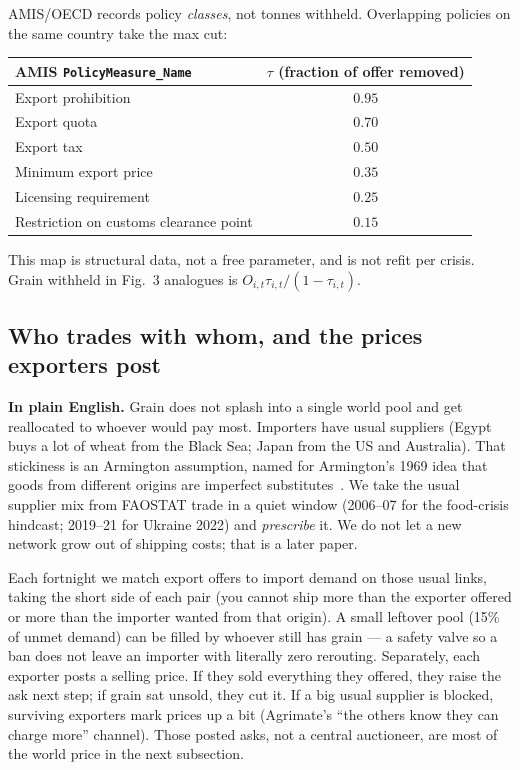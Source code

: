 AMIS/OECD records policy \emph{classes}, not tonnes withheld. Overlapping
policies on the same country take the max cut:
\begin{center}
\small
\begin{tabular}{lc}
\toprule
AMIS \texttt{PolicyMeasure\_Name} & $\tau$ (fraction of offer removed) \\
\midrule
Export prohibition & $0.95$ \\
Export quota & $0.70$ \\
Export tax & $0.50$ \\
Minimum export price & $0.35$ \\
Licensing requirement & $0.25$ \\
Restriction on customs clearance point & $0.15$ \\
\bottomrule
\end{tabular}
\end{center}
This map is structural data, not a free parameter, and is not refit per
crisis. Grain withheld in Fig.~3 analogues is
$O_{i,t}\tau_{i,t}/(1-\tau_{i,t})$.

\subsection{Who trades with whom, and the prices exporters post}
\label{sec:armington}

\textbf{In plain English.} Grain does not splash into a single world pool
and get reallocated to whoever would pay most. Importers have usual
suppliers (Egypt buys a lot of wheat from the Black Sea; Japan from the US
and Australia). That stickiness is an Armington assumption, named for
Armington's 1969 idea that goods from different origins are imperfect
substitutes~\citep{armington1969}. We take the usual supplier mix from
FAOSTAT trade in a quiet window (2006--07 for the food-crisis hindcast;
2019--21 for Ukraine 2022) and \emph{prescribe} it. We do not let a new
network grow out of shipping costs; that is a later paper.

Each fortnight we match export offers to import demand on those usual links,
taking the short side of each pair (you cannot ship more than the exporter
offered or more than the importer wanted from that origin). A small leftover
pool (15\% of unmet demand) can be filled by whoever still has grain --- a
safety valve so a ban does not leave an importer with literally zero
rerouting. Separately, each exporter posts a selling price. If they sold
everything they offered, they raise the ask next step; if grain sat unsold,
they cut it. If a big usual supplier is blocked, surviving exporters mark
prices up a bit (Agrimate's ``the others know they can charge more''
channel). Those posted asks, not a central auctioneer, are most of the
world price in the next subsection.

